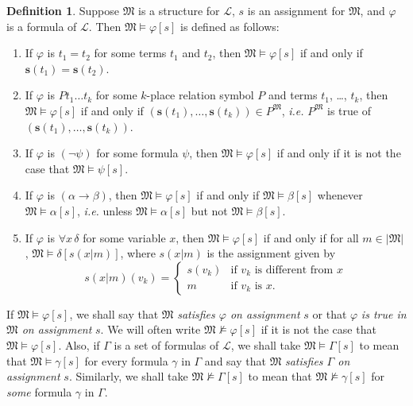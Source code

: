 \documentclass[12pt]{amsbook}
\newcommand{\nmodels}{\nvDash}
\theoremstyle{plain}
\theoremstyle{definition}
\newtheorem{defn}{Definition}[chapter]
\theoremstyle{remark}
\begin{document}
\begin{defn} \label{d:sat} 
Suppose $\mathfrak{M}$ is a structure for $\mathcal{L}$,  $s$ is an assignment for $\mathfrak{M}$,  and $\varphi$ is a formula of $\mathcal{L}$.  Then $\mathfrak{M} \models \varphi [s]$ is defined as follows:\index{$\models$}
\begin{enumerate}
\item If $\varphi$ is $t_1 = t_2$ for some terms $t_1$ and $t_2$,  then $\mathfrak{M} \models \varphi [s]$ if and only if $\mathbf{s}(t_1) = \mathbf{s}(t_2)$.
\item If $\varphi$ is $P t_1 \dots t_k$ for some $k$-place relation symbol $P$ and terms $t_1$,  \dots,  $t_k$,  then $\mathfrak{M} \models \varphi [s]$ if and only if $(\mathbf{s}(t_1), \dots, \mathbf{s}(t_k)) \in P^{\mathfrak{M}}$,  {\em i.e.\/}  $P^{\mathfrak{M}}$ is true of $(\mathbf{s}(t_1), \dots, \mathbf{s}(t_k))$.
\item If $\varphi$ is $(\lnot \psi)$ for some formula $\psi$,  then $\mathfrak{M} \models \varphi [s]$ if and only if it is not the case that $\mathfrak{M} \models \psi [s]$.
\item If $\varphi$ is $(\alpha \to \beta)$,  then $\mathfrak{M} \models \varphi [s]$ if and only if $\mathfrak{M} \models \beta [s]$ whenever $\mathfrak{M} \models \alpha [s]$,  {\em i.e.\/} unless $\mathfrak{M} \models \alpha [s]$ but not $\mathfrak{M} \models \beta [s]$.
\item If $\varphi$ is $\forall x \, \delta$ for some variable $x$,  then $\mathfrak{M} \models \varphi [s]$ if and only if for all $m \in |\mathfrak{M}|$,  $\mathfrak{M} \models \delta [s(x|m)]$,  where $s(x|m)$ is the assignment given by
  \begin{displaymath}
    s(x|m)(v_k) = \begin{cases}
      s(v_k) & \text{if $v_k$ is different from $x$} \\
      m & \text{if $v_k$ is $x$.}
    \end{cases}
  \end{displaymath}
\end{enumerate}
If $\mathfrak{M} \models \varphi [s]$,  we shall say that $\mathfrak{M}$ {\em satisfies $\varphi$ on assignment\/} $s$ or that $\varphi$ {\em is true in $\mathfrak{M}$ on assignment\/} $s$.  We will often write $\mathfrak{M} \nmodels \varphi [s]$ if it is not the case that $\mathfrak{M} \models \varphi [s]$.\index{$\nmodels$}  Also,  if $\Gamma$ is a set of formulas of $\mathcal{L}$,  we shall take $\mathfrak{M} \models \Gamma [s]$ to mean that $\mathfrak{M} \models \gamma [s]$ for every formula $\gamma$ in $\Gamma$ and say that $\mathfrak{M}$ {\em satisfies $\Gamma$ on assignment\/} $s$.  Similarly,  we shall take $\mathfrak{M} \nmodels \Gamma [s]$ to mean that $\mathfrak{M} \nmodels \gamma [s]$ for {\em some\/} formula $\gamma$ in $\Gamma$.
\end{defn}
\end{document}
